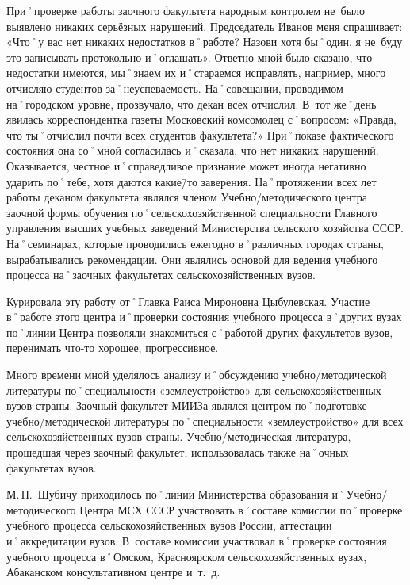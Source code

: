 При˚проверке работы заочного факультета народным контролем не~было выявлено никаких серьёзных нарушений. Председатель Иванов меня спрашивает: «Что˚у вас нет никаких недостатков в˚работе? Назови хотя бы˚один, я не~буду это записывать протокольно и˚оглашать». Ответно мной было сказано, что недостатки имеются, мы˚знаем их и˚стараемся исправлять, например, много отчисляю студентов за˚неуспеваемость. На˚совещании, проводимом на˚городском уровне, прозвучало, что декан всех отчислил. В~тот же˚день явилась корреспондентка газеты Московский комсомолец с˚вопросом: «Правда, что ты˚отчислил почти всех студентов факультета?» При˚показе фактического состояния она со˚мной согласилась и˚сказала, что нет никаких нарушений. Оказывается, честное и˚справедливое признание может иногда негативно ударить по˚тебе, хотя даются какие\=/то заверения. На˚протяжении всех лет работы деканом факультета являлся членом Учебно\-/методического центра заочной формы обучения по˚сельскохозяйственной специальности Главного управления высших учебных заведений Министерства сельского хозяйства СССР. На˚семинарах, которые проводились ежегодно в˚различных городах страны, вырабатывались рекомендации. Они являлись основой для ведения учебного процесса на˚заочных факультетах сельскохозяйственных вузов.

Курировала эту работу от˚Главка Раиса Мироновна Цыбулевская. Участие в˚работе этого центра и˚проверки состояния учебного процесса в˚других вузах по˚линии Центра позволяли знакомиться с˚работой других факультетов вузов, перенимать что-то хорошее, прогрессивное.

Много времени мной уделялось анализу и˚обсуждению учебно\-/методической литературы по˚специальности «землеустройство» для сельскохозяйственных вузов страны. Заочный факультет МИИЗа являлся центром по˚подготовке учебно\-/методической литературы по˚специальности «землеустройство» для всех сельскохозяйственных вузов страны. Учебно\-/методическая литература, прошедшая через заочный факультет, использовалась также на˚очных факультетах вузов.

М.\,П.~Шубичу приходилось по˚линии Министерства образования и˚Учебно\-/методического Центра МСХ СССР участвовать в˚составе комиссии по˚проверке учебного процесса сельскохозяйственных вузов России, аттестации и˚аккредитации вузов. В~составе комиссии участвовал в˚проверке состояния учебного процесса в˚Омском, Красноярском сельскохозяйственных вузах, Абаканском консультативном центре и~т.~д.

